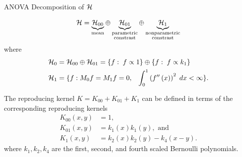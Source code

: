 \begin{frame}{ANOVA Decomposition of $\mathcal{H}$}{}

\begin{equation*}%
\hilbert = \underbrace{\hilbert_{00}}_{\text{mean}}  \oplus  \underbrace{\hilbert_{01}}_{\substack{\text{parametric} \\ \text{constrast}}} \oplus \underbrace{\hilbert_1}_{\substack{\text{nonparametric} \\ \text{constrast}}}
\end{equation*}
where
\begin{align*}
\hilbert_0 &=  \hilbert_{00} \oplus \hilbert_{01} = \left\{f: \;f \propto 1 \right\} \oplus \left\{f: \;f \propto k_1\right\} \\
\hilbert_{1} &= \lbrace f: M_0 f = M_1 f =  0,\;\;\;\int_{0}^1 \left(f''\left(x\right)\right)^2\;dx < \infty \rbrace. %
\end{align*}

The reproducing kernel $K = K_{00} + K_{01} + K_1$ can be defined in terms of the corresponding reproducing kernels 
\begin{align*}
K_{00}\left(x,y\right) &= 1,\\
K_{01}\left(x,y\right) &= k_1\left(x\right)k_1\left(y\right), \mbox{ and}\\
K_{1}\left(x,y\right) &= k_2\left(x\right)k_2\left(y\right) - k_4\left(x-y\right).
\end{align*}
where $k_1, k_2, k_4$ are the first, second, and fourth scaled Bernoulli polynomials.
\end{frame}


%

